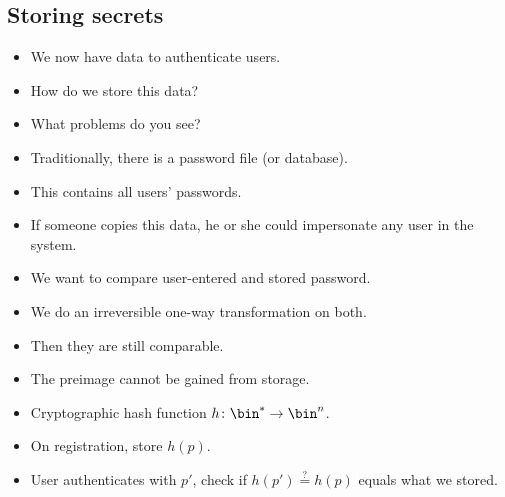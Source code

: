 \subsection{Storing secrets}

\begin{frame}
  \begin{exercise}
    \begin{itemize}
      \item We now have data to authenticate users.
      \item How do we store this data?
      \item What problems do you see?
    \end{itemize}
  \end{exercise}
\end{frame}

\begin{frame}
  \begin{example}
    \begin{itemize}
      \item Traditionally, there is a password file (or database).
      \item This contains all users' passwords.

        \pause{}

      \item If someone copies this data, he or she could impersonate any user 
        in the system.
    \end{itemize}
  \end{example}
\end{frame}

\begin{frame}
  \begin{solution}[Passwords]
    \begin{itemize}
      \item We want to compare user-entered and stored password.
      \item We do an irreversible one-way transformation on both.
      \item Then they are still comparable.
      \item The preimage cannot be gained from storage.
    \end{itemize}
  \end{solution}

  \pause{}

  \begin{example}
    \begin{itemize}
      \item Cryptographic hash function \(h\colon \bin^*\to \bin^n\).
      \item On registration, store \(h(p)\).
      \item User authenticates with \(p'\), check if \(h(p') \stackrel{?}{=}  
          h(p)\) equals what we stored.
    \end{itemize}
  \end{example}
\end{frame}

